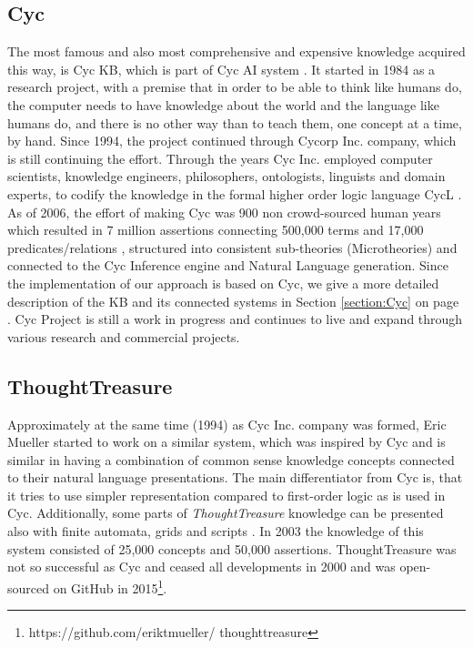 \subsection{Cyc}
\label{section:relatedcyc}
 The most famous and also most comprehensive and expensive 
knowledge acquired this way, is Cyc KB, which is part of Cyc AI system 
\parencite{Lenat1995}. It started in 1984 as a research project, with a premise 
that in order to be able to think like humans do, the computer needs to have 
knowledge about the world and the language like humans do, and there is no other
way than to teach them, one concept at a time, by hand. Since 1994, the project 
continued through Cycorp Inc. company, which is still continuing the effort. 
Through the years Cyc Inc. employed computer scientists, knowledge engineers, 
philosophers, ontologists, linguists and domain experts, to codify the knowledge
in the formal higher order logic language CycL \parencite{Matuszek2006}. As of 
2006, the effort of making Cyc was 900 non crowd-sourced 
human years which resulted in 7 million assertions connecting 500,000 terms and 
17,000 predicates/relations \parencite{Zang2013}, structured into consistent 
sub-theories (Microtheories) and connected to the Cyc Inference engine and 
Natural Language generation. Since the implementation of our approach is based
on Cyc, we give a more detailed description of the KB and its connected systems
in Section \ref{section:Cyc} on page \pageref{section:Cyc}. Cyc Project is still 
a work in progress and continues to live and expand through various research and
commercial projects.

\subsection{ThoughtTreasure}
\label{section:r:thought}
 Approximately at the same time (1994) as Cyc Inc. 
company was formed, Eric Mueller started to work on a similar system, which was
inspired by Cyc and is similar in having a combination of common sense knowledge
concepts connected to their natural language presentations. The main 
differentiator from Cyc is, that it tries to use simpler representation compared
to first-order logic as is used in Cyc. Additionally, some parts of 
\emph{ThoughtTreasure} knowledge can be presented also with finite automata, 
grids and scripts \parencite{Mueller1999,Mueller2003}. In 2003 the knowledge of
this system consisted of 25,000 concepts and 50,000 assertions. ThoughtTreasure 
was not so successful as Cyc and ceased all developments in 2000 and was 
open-sourced on GitHub in 2015\footnote{https://github.com/eriktmueller/
thoughttreasure}. 

